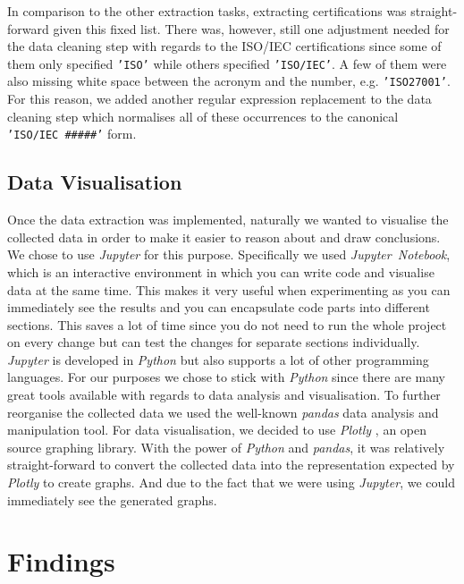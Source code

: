 \documentclass[runningheads]{llncs}
\begin{document}
In comparison to the other extraction tasks, extracting certifications was straight-forward given this fixed list. There was, however, still one adjustment needed for the data cleaning step with regards to the ISO/IEC certifications since some of them only specified \texttt{'ISO'} while others specified \texttt{'ISO/IEC'}. A few of them were also missing white space between the acronym and the number, e.g. \texttt{'ISO27001'}. For this reason, we added another regular expression replacement to the data cleaning step which normalises all of these occurrences to the canonical \texttt{'ISO/IEC~\#\#\#\#\#'} form.

\subsection{Data Visualisation}
\label{sub:data_visualisation}

Once the data extraction was implemented, naturally we wanted to visualise the collected data in order to make it easier to reason about and draw conclusions. We chose to use \textit{Jupyter} \cite{jupyter} for this purpose. Specifically we used \textit{Jupyter~Notebook}, which is an interactive environment in which you can write code and visualise data at the same time. This makes it very useful when experimenting as you can immediately see the results and you can encapsulate code parts into different sections. This saves a lot of time since you do not need to run the whole project on every change but can test the changes for separate sections individually. \textit{Jupyter} is developed in \textit{Python} \cite{python} but also supports a lot of other programming languages. For our purposes we chose to stick with \textit{Python} since there are many great tools available with regards to data analysis and visualisation. To further reorganise the collected data we used the well-known \textit{pandas} \cite{pandas} data analysis and manipulation tool. For data visualisation, we decided to use \textit{Plotly} \cite{plotly}, an open source graphing library. With the power of \textit{Python} and \textit{pandas}, it was relatively straight-forward to convert the collected data into the representation expected by \textit{Plotly} to create graphs. And due to the fact that we were using \textit{Jupyter}, we could immediately see the generated graphs.

\section{Findings}
\label{sec:findings}
\end{document}
